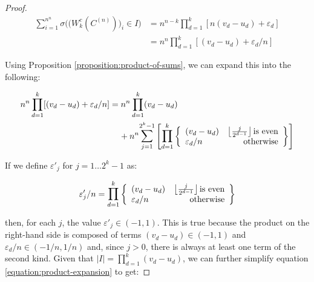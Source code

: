 \documentclass[11pt,a4paper]{tesis}
\theoremstyle{plain}
\theoremstyle{definition}
\begin{document}
\begin{proof}
  \begin{equation}\label{equation:count-windows-c-n}
    \begin{aligned}
      \sum_{i = 1}^{n^n} \sigma\Big( \big( W_k^{c}(C^{(n)}) \big)_i \in I \Big) & = n^{n - k} \prod_{d = 1}^{k} [n (v_d - u_d) + \varepsilon_d] \\
      & = n^n \prod_{d = 1}^{k} [(v_d - u_d) + \varepsilon_d / n]
    \end{aligned}
  \end{equation}

  Using Proposition \ref{proposition:product-of-sums}, we can expand this into the following:

  \begin{equation}\label{equation:product-expansion}
    \begin{aligned}
      n^n \prod_{d = 1}^{k} [(v_d - u_d) + \varepsilon_d / n]
      & = n^n \prod_{d = 1}^{k} (v_d - u_d) \\
      & \hspace*{4mm} + n^n \mathlarger{\sum}_{j = 1}^{2^k - 1}
      \left [ \mathlarger{\prod}_{d = 1}^{k} \left \{ \begin{array}{lr}
      (v_d - u_d) & \left\lfloor \frac{j}{2^{d - 1}} \right\rfloor \text{is even} \\
      \varepsilon_d / n & \text{otherwise}
    \end{array} \right \} \right ]
    \end{aligned}
  \end{equation}

  If we define $\varepsilon'_j$ for $j = 1 \dots 2^k - 1$ as:

  \begin{equation*}
    \varepsilon'_j / n = \mathlarger{\prod}_{d = 1}^{k} \left \{ \begin{array}{lr}
      (v_d - u_d) & \left\lfloor \frac{j}{2^{d - 1}} \right\rfloor \text{is even} \\
      \varepsilon_d / n & \text{otherwise}
    \end{array} \right \}
  \end{equation*}

  then, for each $j$, the value $\varepsilon'_j \in (-1, 1)$. This is true because the product on the right-hand side is composed of terms $(v_d - u_d) \in (-1, 1)$ and $\varepsilon_d / n \in (-1/n, 1/n)$ and, since $j > 0$, there is always at least one term of the second kind. Given that $|I| = \prod_{d = 1}^{k} (v_d - u_d)$, we can further simplify equation \ref{equation:product-expansion} to get:


\end{proof}
\end{document}

